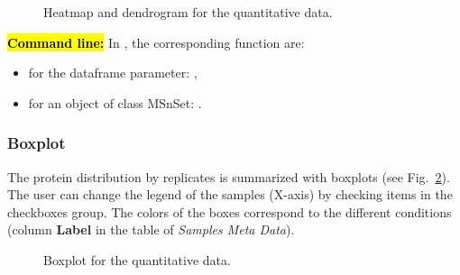 \documentclass[12pt]{article}
\begin{document}
{\begin {figure}
\centering
{}
\caption{Heatmap and dendrogram for the quantitative data.}\label{fig:sdhm}
\end {figure}

\hl{\bf Command line:} In , the corresponding function are:
\begin{itemize}
\item for the dataframe parameter: ,
\item for an object of class MSnSet: .
\end{itemize}

\subsubsection {Boxplot}\label{sec:boxplot}

The protein distribution by replicates is summarized with boxplots 
(see Fig.~\ref{fig:boxplot}). The user can change the legend of the samples 
(X-axis) by checking items in the checkboxes group. The colors of the boxes 
correspond to the different conditions (column \textbf{Label} in the table of 
\emph {Samples Meta Data}).

\begin {figure}
\centering
{}
\caption{Boxplot for the quantitative data.}\label{fig:boxplot}
\end {figure}



}
\end{document}

